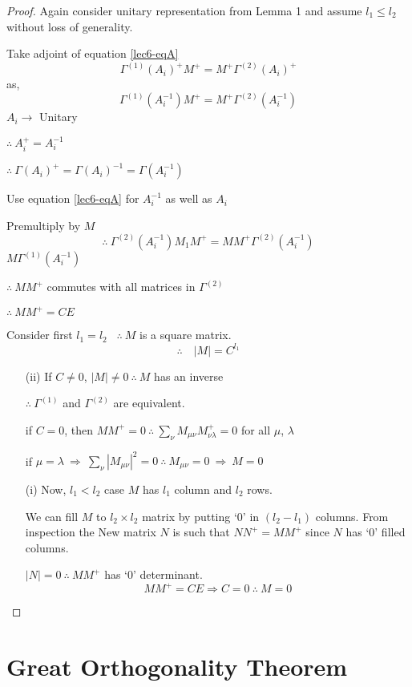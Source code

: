 \begin{proof}
Again consider unitary representation from Lemma 1 and assume $l_{1}\leq l_{2}$ without loss of generality.

Take adjoint of equation \eqref{lec6-eqA}
$$
\Gamma^{(1)}(A_{i})^{+}M^{+}=M^{+}\Gamma^{(2)}(A_{i})^{+}
$$
as,
$$
\Gamma^{(1)}(A^{-1}_{i})M^{+}=M^{+}\Gamma^{(2)}(A^{-1}_{i})
$$
$A_{i}\to$ Unitary

$\therefore \ A^{+}_{i}=A^{-1}_{i}$

$\therefore \ \Gamma(A_{i})^{+}=\Gamma(A_{i})^{-1}=\Gamma(A^{-1}_{i})$

Use equation \eqref{lec6-eqA} for $A^{-1}_{i}$ as well as $A_{i}$

Premultiply by $M$
$$
\therefore  \ \Gamma^{(2)}(A^{-1}_{i})M_{1}M^{+}=MM^{+}\Gamma^{(2)}(A^{-1}_{i})
$$
$M\Gamma^{(1)}(A^{-1}_{i})$

$\therefore \ MM^{+}$ commutes with all matrices in $\Gamma^{(2)}$

$\therefore \ MM^{+}=CE$

Consider first $l_{1}=l_{2}$ \ $\therefore \ M$ is a square matrix.
$$
\therefore\quad |M|=C^{l_{1}}
$$
\begin{itemize}
\item[(ii)] If $C\neq 0$, $|M|\neq 0 \ \therefore \ M$ has an inverse

$\therefore \ \Gamma^{(1)}$ and $\Gamma^{(2)}$ are equivalent.

if $C=0$, then $MM^{+}=0 \ \therefore \ \sum\limits_{\nu}M_{\mu\nu}M^{+}_{\nu\lambda}=0$ for all $\mu$, $\lambda$

if $\mu=\lambda \ \Rightarrow \ \sum\limits_{\nu}|M_{\mu\nu}|^{2}=0 \ \therefore \ M_{\mu\nu}=0 \ \Rightarrow \ M=0$

\item[(i)] Now, $l_{1}<l_{2}$ case $M$ has $l_{1}$ column and $l_{2}$ rows.

We can fill $M$ to $l_{2}\times l_{2}$ matrix by putting `$0$' in $(l_{2}-l_{1})$ columns. From inspection the New matrix $N$ is such that $NN^{+}=MM^{+}$ since $N$ has `$0$' filled columns. 

$|N|=0 \ \therefore \ MM^{+}$ has `$0$' determinant.
$$
MM^{+}=CE \Rightarrow C=0 \ \therefore \ M=0
$$
\end{itemize}
\end{proof}

\section*{Great Orthogonality Theorem}

